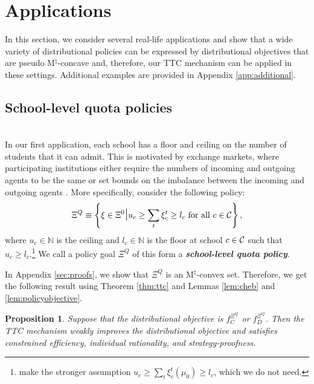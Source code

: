 \documentclass[12pt]{amsart}
\newtheorem{proposition}{Proposition}
\theoremstyle{remark}
\newcommand{\df}[1]{\textbf{\textit{#1}}}
\begin{document}
\section{Applications}\label{sec:applications}
In this section, we consider several real-life applications and show that a wide variety of
distributional policies can be expressed by distributional objectives that are pseudo M$^{\natural}$-concave
and, therefore, our TTC mechanism can be applied in these settings. Additional examples are provided in Appendix \ref{app:additional}.

\subsection{School-level quota policies}\label{sec:exchange}\hfill\\
In our first application, each school has a floor and ceiling on the number of students that it can admit. This is motivated by exchange markets, where participating institutions
either require the numbers of incoming and outgoing agents to be the same or set bounds on the imbalance between the incoming and outgoing agents \citep{dur2015two}.
More specifically, consider the following policy:
\[\Xi^Q \equiv \left \{\xi \in \Xi^0 \mathlarger{\mathlarger{\mid}}  u_c \geq \sum_{t} \xi_c^t \geq l_c \text{ for all } c\in \calc \right \},\]
where $u_c\in \mathbb N$ is the ceiling and $l_c \in \mathbb N$ is the floor at school $c\in \mathcal{C}$ such that $u_c \geq l_c$.\footnote{\cite{dur2015two} make the
stronger assumption $u_c \geq \sum_{t} \xi_c^t(\mu_0) \geq l_c$, which we do not need.}
We call a policy goal $\Xi^Q$ of this form a \df{school-level quota policy}.

In Appendix \ref{sec:proofs}, we show that $\Xi^Q$ is an M$^{\natural}$-convex set. Therefore, we get the following
result using Theorem \ref{thm:ttc} and Lemmas \ref{lem:cheb} and \ref{lem:policyobjective}.

\begin{proposition}\label{prop:quotas}
Suppose that the distributional objective is $f_C^{\Xi^Q}$ or $f_D^{\Xi^Q}$. Then the TTC mechanism weakly improves the distributional objective and satisfies constrained efficiency, individual rationality, and strategy-proofness.
\end{proposition}
\end{document}

